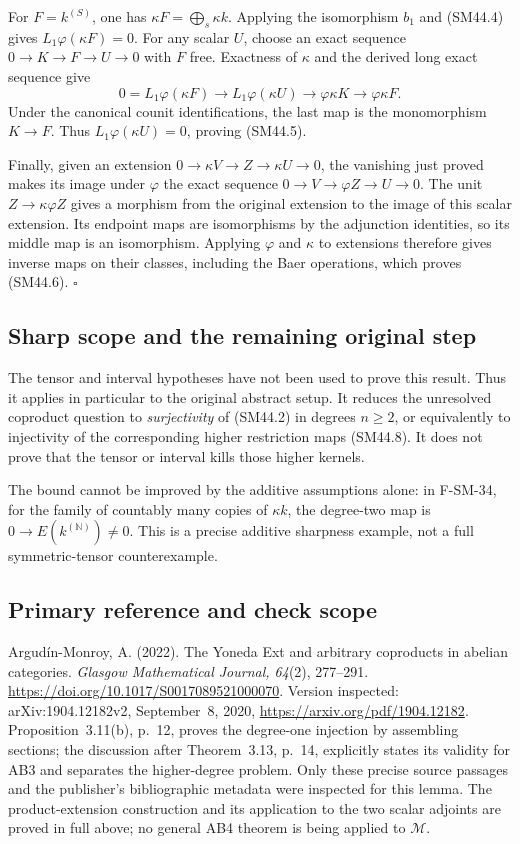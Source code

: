 For \(F=k^{(S)}\), one has
\(\kappa F=\bigoplus_s\kappa k\).  Applying the isomorphism
\(b_1\) and (SM44.4) gives
\(L_1\varphi(\kappa F)=0\).  For any scalar \(U\), choose
an exact sequence \(0\to K\to F\to U\to0\) with \(F\)
free.  Exactness of \(\kappa\) and the derived long exact
sequence give
\[
 0=L_1\varphi(\kappa F)\longrightarrow L_1\varphi(\kappa U)
       \longrightarrow\varphi\kappa K\longrightarrow\varphi\kappa F.
\]
Under the canonical counit identifications, the last map is
the monomorphism \(K\to F\).  Thus
\(L_1\varphi(\kappa U)=0\), proving (SM44.5).

Finally, given an extension
\(0\to\kappa V\to Z\to\kappa U\to0\), the vanishing
just proved makes its image under \(\varphi\) the exact
sequence \(0\to V\to\varphi Z\to U\to0\).
The unit \(Z\to\kappa\varphi Z\) gives a morphism from
the original extension to the image of this scalar extension.
Its endpoint maps are isomorphisms by the adjunction identities,
so its middle map is an isomorphism.  Applying \(\varphi\)
and \(\kappa\) to extensions therefore gives inverse maps
on their classes, including the Baer operations, which proves
(SM44.6).  \(\square\)

\subsection{Sharp scope and the remaining original step}
The tensor and interval hypotheses have not been used to prove
this result.  Thus it applies in particular to the original
abstract setup.  It reduces the unresolved coproduct question
to \emph{surjectivity} of (SM44.2) in degrees \(n\ge2\),
or equivalently to injectivity of the corresponding higher
restriction maps (SM44.8).  It does not prove that the tensor
or interval kills those higher kernels.

The bound cannot be improved by the additive assumptions alone:
in F-SM-34, for the family of countably many copies of
\(\kappa k\), the degree-two map is
\(0\to E(k^{(\mathbb N)})\ne0\).  This is a precise additive
sharpness example, not a full symmetric-tensor counterexample.

\subsection{Primary reference and check scope}
Argud\'in-Monroy, A. (2022). The Yoneda Ext and arbitrary
coproducts in abelian categories. \emph{Glasgow Mathematical
Journal, 64}(2), 277--291.
\url{https://doi.org/10.1017/S0017089521000070}.
Version inspected: arXiv:1904.12182v2, September~8, 2020,
\url{https://arxiv.org/pdf/1904.12182}.
Proposition~3.11(b), p.~12, proves the degree-one injection by
assembling sections; the discussion after Theorem~3.13, p.~14,
explicitly states its validity for AB3 and separates the
higher-degree problem.  Only these precise source passages
and the publisher's bibliographic metadata were inspected for
this lemma.  The product-extension construction and its
application to the two scalar adjoints are proved in full above;
no general AB4 theorem is being applied to \(\mathcal M\).
